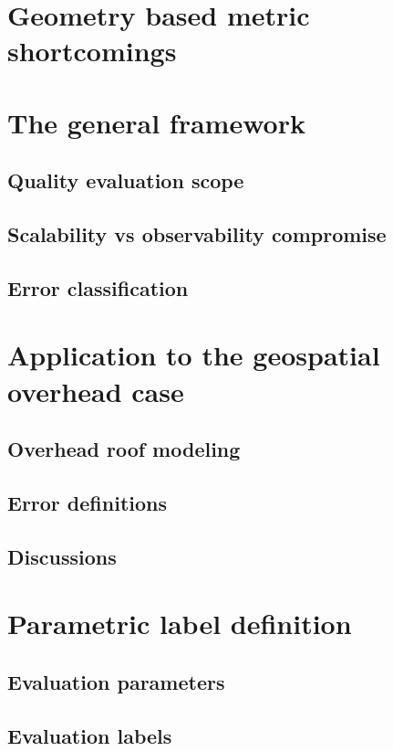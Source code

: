 \minitoc
\section{Geometry based metric shortcomings}
    \subsection{}
\section{The general framework}
    \subsection{Quality evaluation scope}
    \subsection{Scalability vs observability compromise}
    \subsection{Error classification}
\section{Application to the geospatial overhead case}
    \subsection{Overhead roof modeling}
    \subsection{Error definitions}
    \subsection{Discussions}
\section{Parametric label definition}
    \subsection{Evaluation parameters}
    \subsection{Evaluation labels}
